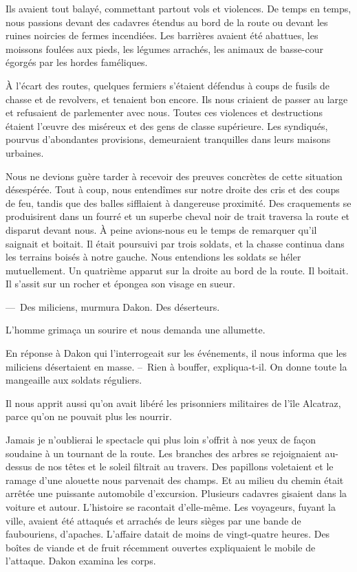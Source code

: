 \documentclass[french,twoside]{book} %
\begin{document}
Ils avaient tout balayé, commettant partout vols et violences. De temps en temps, nous passions devant des cadavres étendus au bord de la route ou devant les ruines noircies de fermes incendiées. Les barrières avaient été abattues, les moissons foulées aux pieds, les légumes arrachés, les animaux de basse-cour égorgés par les hordes faméliques.\par
À l’écart des routes, quelques fermiers s’étaient défendus à coups de fusils de chasse et de revolvers, et tenaient bon encore. Ils nous criaient de passer au large et refusaient de parlementer avec nous. Toutes ces violences et destructions étaient l’œuvre des miséreux et des gens de classe supérieure. Les syndiqués, pourvus d’abondantes provisions, demeuraient tranquilles dans leurs maisons urbaines.\par
Nous ne devions guère tarder à recevoir des preuves concrètes de cette situation désespérée. Tout à coup, nous entendîmes sur notre droite des cris et des coups de feu, tandis que des balles sifflaient à dangereuse proximité. Des craquements se produisirent dans un fourré et un superbe cheval noir de trait traversa la route et disparut devant nous. À peine avions-nous eu le temps de remarquer qu’il saignait et boitait. Il était poursuivi par trois soldats, et la chasse continua dans les terrains boisés à notre gauche. Nous entendions les soldats se héler mutuellement. Un quatrième apparut sur la droite au bord de la route. Il boitait. Il s’assit sur un rocher et épongea son visage en sueur.\par
— Des miliciens, murmura Dakon. Des déserteurs.\par
L’homme grimaça un sourire et nous demanda une allumette.\par
En réponse à Dakon qui l’interrogeait sur les événements, il nous informa que les miliciens désertaient en masse. – Rien à bouffer, expliqua-t-il. On donne toute la mangeaille aux soldats réguliers.\par
Il nous apprit aussi qu’on avait libéré les prisonniers militaires de l’île Alcatraz, parce qu’on ne pouvait plus les nourrir.\par
Jamais je n’oublierai le spectacle qui plus loin s’offrit à nos yeux de façon soudaine à un tournant de la route. Les branches des arbres se rejoignaient au-dessus de nos têtes et le soleil filtrait au travers. Des papillons voletaient et le ramage d’une alouette nous parvenait des champs. Et au milieu du chemin était arrêtée une puissante automobile d’excursion. Plusieurs cadavres gisaient dans la voiture et autour. L’histoire se racontait d’elle-même. Les voyageurs, fuyant la ville, avaient été attaqués et arrachés de leurs sièges par une bande de faubouriens, d’apaches. L’affaire datait de moins de vingt-quatre heures. Des boîtes de viande et de fruit récemment ouvertes expliquaient le mobile de l’attaque. Dakon examina les corps.\par
\end{document}
